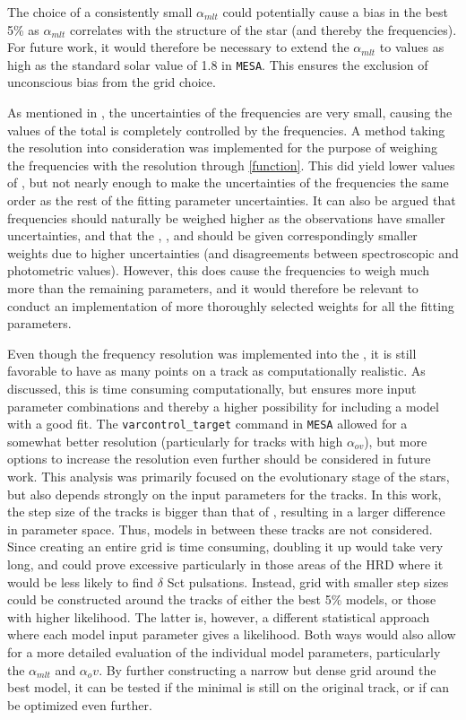The choice of a consistently small $\alpha_{mlt}$ could potentially cause a bias in the best 5\% as $\alpha_{mlt}$ correlates with the structure of the star (and thereby the frequencies). For future work, it would therefore be necessary to extend the $\alpha_{mlt}$ to values as high as the standard solar value of 1.8 in \texttt{MESA}. This ensures the exclusion of unconscious bias from the grid  choice. 
 
As mentioned in , the uncertainties of the frequencies are very small, causing the values of the total \chis is completely controlled by the frequencies. A method taking the resolution into consideration was implemented for the purpose of weighing the frequencies with the resolution through \eqref{function}.  This did yield lower values of \chis, but not nearly enough to make the uncertainties of the frequencies the same order as the rest of the fitting parameter uncertainties. It can also be argued that frequencies should naturally be weighed higher as the observations have smaller uncertainties, and that the \logg, \teff, and \lum should be given correspondingly smaller weights due to higher uncertainties (and disagreements between spectroscopic and photometric values). However, this does cause the frequencies to weigh much more than the remaining parameters, and it would therefore be relevant to conduct an implementation of more thoroughly selected weights for all the fitting parameters.

Even though the frequency resolution was implemented into the \chis, it is still favorable to have as many points on a track as computationally realistic. As discussed, this is time consuming computationally, but ensures  more input parameter combinations and thereby a higher possibility for including a model with a good fit. The \texttt{varcontrol\_target} command in \texttt{MESA} allowed for a somewhat better resolution (particularly for tracks with high $\alpha_{ov}$), but more options to increase the resolution even further should be considered in future work. This analysis was primarily focused on the evolutionary stage of the stars, but also depends strongly on the input parameters for the tracks. In this work, the step size of the tracks is bigger than that of \citet{lenz2010delta}, resulting in a larger difference in parameter space. Thus, models in between these tracks are not considered. Since creating an entire grid is time consuming, doubling it up would take very long, and could prove excessive particularly in those areas of the HRD where it would be less likely to find $\delta$ Sct pulsations. Instead, grid with smaller step sizes could be constructed around the tracks of either the best 5\% models, or those with higher likelihood. The latter is, however, a different statistical approach where each model input parameter gives a likelihood. Both ways would also allow for a more detailed evaluation of the individual model parameters, particularly the $\alpha_{mlt}$ and $\alpha_ov$. By further constructing a narrow but dense grid around the best model, it can be tested if the minimal \chis is still on the original track, or if \chis can be optimized even further.  

